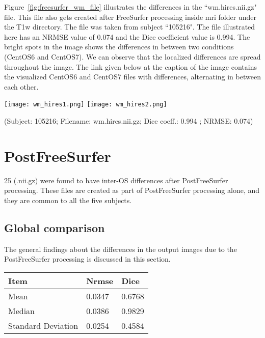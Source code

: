 Figure~\ref{fig:freesurfer_wm_file} illustrates the differences in the ``wm.hires.nii.gz" file. This file also gets created after FreeSurfer processing inside mri folder under the T1w directory. The file was taken from subject ``105216". The file illustrated here has an NRMSE value of 0.074 and the Dice coefficient value is 0.994. The bright spots in the image shows the differences in between two conditions (CentOS6 and CentOS7). We can observe that the localized differences are spread throughout the image. The link given below at the caption of the image contains the visualized CentOS6 and CentOS7 files with differences, alternating in between each other.

\begin{center}
\texttt{[image: wm\_hires1.png]}%
\texttt{[image: wm\_hires2.png]}
\caption*{(Subject: 105216; Filename: wm.hires.nii.gz; Dice coeff.: 0.994 ; NRMSE: 0.074)}
\label{fig:freesurfer_wm_file}
\end{center}

\section{PostFreeSurfer}\label{sec:Postfreesurfer}
25 (.nii.gz) were found to have inter-OS differences after PostFreeSurfer processing. These files are created as part of PostFreeSurfer processing alone, and they are common to all the five subjects.

\subsection{Global comparison}
The general findings about the differences in the output images due to the PostFreeSurfer processing is discussed in this section.

\begin{center}
\begin{tabular}{|l|l|l|}
\hline
\textbf{Item}      & \textbf{Nrmse} & \textbf{Dice} \\ \hline
Mean               & 0.0347     & 0.6768   \\ \hline
Median             & 0.0386    & 0.9829   \\ \hline
Standard Deviation & 0.0254    & 0.4584   \\ \hline
\end{tabular}
\label{tab:PostFreeSurfer_Metic_Values}
\end{center}

